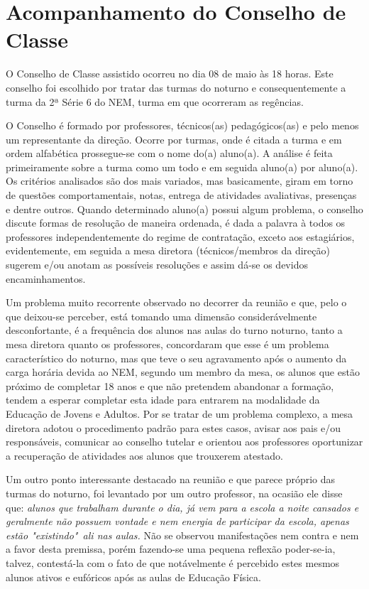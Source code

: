 \section{Acompanhamento do Conselho de Classe} %
\label{sub:Acompanhamento do Conselho de Classe}
O Conselho de Classe assistido ocorreu no dia 08 de maio às 18 horas. Este conselho foi escolhido por tratar das turmas do noturno e consequentemente a turma da 2ª Série 6 do \ac{NEM}, turma em que ocorreram as regências.

O Conselho é formado por professores, técnicos(as) pedagógicos(as) e pelo menos um representante da direção. Ocorre por turmas, onde é citada a turma e em ordem alfabética prossegue-se com o nome do(a) aluno(a). A análise é feita primeiramente sobre a turma como um todo e em seguida aluno(a) por aluno(a). Os critérios analisados são dos mais variados, mas basicamente, giram em torno de questões comportamentais, notas, entrega de atividades avaliativas, presenças e dentre outros. Quando determinado aluno(a) possui algum problema, o conselho discute formas de resolução de maneira ordenada, é dada a palavra à todos os professores independentemente do regime de contratação, exceto aos estagiários, evidentemente, em seguida a mesa diretora (técnicos/membros da direção) sugerem e/ou anotam as possíveis resoluções e assim dá-se os devidos encaminhamentos.

Um problema muito recorrente observado no decorrer da reunião e que, pelo o que deixou-se perceber, está tomando uma dimensão considerávelmente desconfortante, é a frequência dos alunos nas aulas do turno noturno, tanto a mesa diretora quanto os professores, concordaram que esse é um problema característico do noturno, mas que teve o seu agravamento após o aumento da carga horária devida ao \ac{NEM}, segundo um membro da mesa, os alunos que estão próximo de completar 18 anos e que não pretendem abandonar a formação, tendem a esperar completar esta idade para entrarem na modalidade da Educação de Jovens e Adultos. Por se tratar de um problema complexo, a mesa diretora adotou o procedimento padrão para estes casos, avisar aos pais e/ou responsáveis, comunicar ao conselho tutelar e orientou aos professores oportunizar a recuperação de atividades aos alunos que trouxerem atestado.

Um outro ponto interessante destacado na reunião e que parece próprio das turmas do noturno, foi levantado por um outro professor, na ocasião ele disse que: \textit{alunos que trabalham durante o dia, já vem para a escola a noite cansados e geralmente não possuem vontade e nem energia de participar da escola, apenas estão "existindo"~ali nas aulas.} Não se observou manifestações nem contra e nem a favor desta premissa, porém fazendo-se uma pequena reflexão poder-se-ia, talvez, contestá-la com o fato de que notávelmente é percebido estes mesmos alunos ativos e eufóricos após as aulas de Educação Física.

